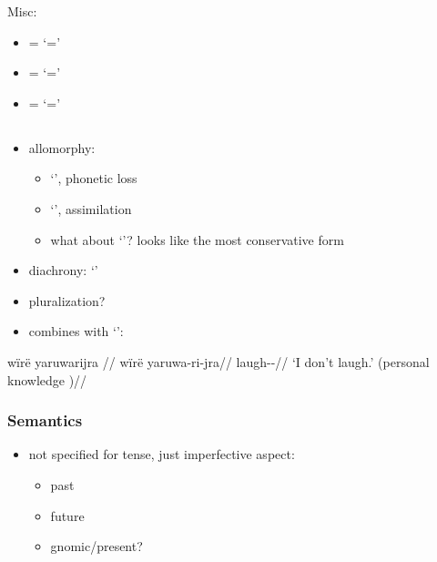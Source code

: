 \documentclass{memoir}
\begin{document}
Misc:

\begin{itemize}
\tightlist
\item
  = `='
\item
  = `='
\item
  = `='
\end{itemize}

\subsection{\texorpdfstring{ \label{sec:riipfv}}{ }}

\begin{itemize}
\tightlist
\item
  allomorphy:

  \begin{itemize}
  \tightlist
  \item
     `', phonetic loss
  \item
     `', assimilation
  \item
    what about  `'? looks like the most conservative
    form
  \end{itemize}
\item
  diachrony:  `'
\item
  pluralization?
\item
  combines with  `':
\end{itemize}

\ex \label{convrisamaj-4}
\begingl \glpreamble wïrë yaruwarijra //
\gla wïrë yaruwa-ri-jra//
\glb {} laugh--//
\glft ‘I don’t laugh.’ (personal knowledge
)//
\endgl
\xe

\subsubsection{Semantics}

\begin{itemize}
\tightlist
\item
  not specified for tense, just imperfective aspect:

  \begin{itemize}
  \tightlist
  \item
    past 
  \item
    future 
  \item
    gnomic/present? 
  \end{itemize}
\end{itemize}
\end{document}
